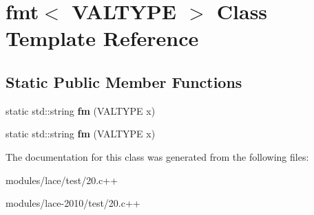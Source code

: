 \hypertarget{classfmt}{\section{fmt$<$ V\-A\-L\-T\-Y\-P\-E $>$ Class Template Reference}
\label{classfmt}
}
\subsection*{Static Public Member Functions}
\begin{DoxyCompactItemize}
\item 
\hypertarget{classfmt_ac13e5591b2bb0d73cd342e03c541e35b}{static std\-::string {\bfseries fm} (V\-A\-L\-T\-Y\-P\-E x)}\label{classfmt_ac13e5591b2bb0d73cd342e03c541e35b}

\item 
\hypertarget{classfmt_ac13e5591b2bb0d73cd342e03c541e35b}{static std\-::string {\bfseries fm} (V\-A\-L\-T\-Y\-P\-E x)}\label{classfmt_ac13e5591b2bb0d73cd342e03c541e35b}

\end{DoxyCompactItemize}


The documentation for this class was generated from the following files\-:\begin{DoxyCompactItemize}
\item 
modules/lace/test/20.\-c++\item 
modules/lace-\/2010/test/20.\-c++\end{DoxyCompactItemize}
